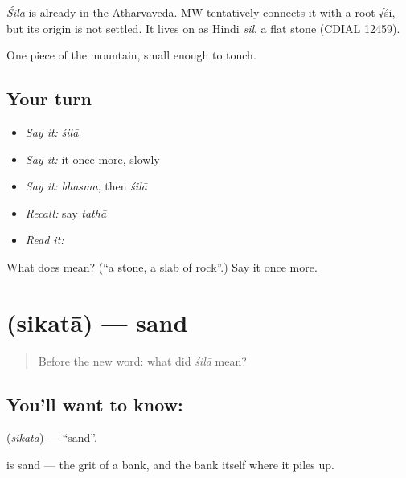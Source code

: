 \begin{cousinweb}
\emph{Śilā} is already in the Atharvaveda. MW tentatively connects it with a root √śi, but its origin is not settled. It lives on as Hindi \emph{sil}, a flat stone (CDIAL 12459).
\end{cousinweb}

\begin{grammarlens}[title={What you've built}]
One piece of the mountain, small enough to touch.
\end{grammarlens}

\subsection*{Your turn}
\begin{itemize}
\raggedright
  \item \emph{Say it:} \emph{śilā}
  \item \emph{Say it:} it once more, slowly
  \item \emph{Say it:} \emph{bhasma}, then \emph{śilā}
  \item \emph{Recall:} say \emph{tathā}
  \item \emph{Read it:} \textbf{}
\end{itemize}

\begin{tcolorbox}[breakable,colback=teal!4,colframe=teal!35!black,title={Before you move on}]
What does  mean? (\textquotedblleft{}a stone, a slab of rock\textquotedblright{}.) Say it once more.
\end{tcolorbox}
\section[\texorpdfstring{\sk{सिकता} (sikatā)}{सिकता (sikatā)}]{ (sikatā) — sand}

\label{lesson:SA-C38-sand}



\begin{quote}
Before the new word: what did \emph{śilā} mean?
\end{quote}

\subsection*{You'll want to know: }
\textbf{} (\emph{sikatā}) — \textquotedblleft{}sand\textquotedblright{}.

\textbf{} is sand — the grit of a bank, and the bank itself where it piles up.


